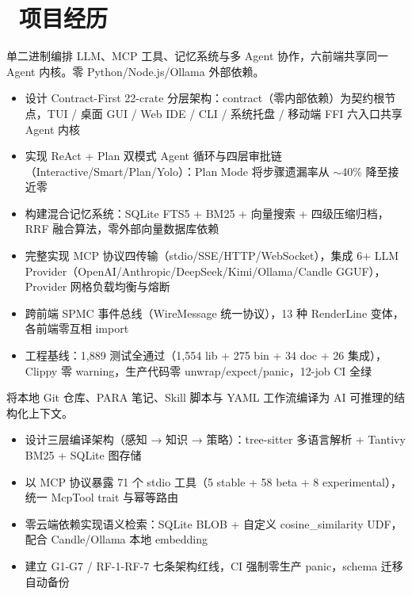 \documentclass{resume}
\begin{document}
\section{\faUsers\ 项目经历}
单二进制编排 LLM、MCP 工具、记忆系统与多 Agent 协作，六前端共享同一 Agent 内核。零 Python/Node.js/Ollama 外部依赖。
\begin{itemize}
  \item 设计 Contract-First 22-crate 分层架构：contract（零内部依赖）为契约根节点，TUI / 桌面 GUI / Web IDE / CLI / 系统托盘 / 移动端 FFI 六入口共享 Agent 内核
  \item 实现 ReAct + Plan 双模式 Agent 循环与四层审批链（Interactive/Smart/Plan/Yolo）：Plan Mode 将步骤遗漏率从 $\sim$40\% 降至接近零
  \item 构建混合记忆系统：SQLite FTS5 + BM25 + 向量搜索 + 四级压缩归档，RRF 融合算法，零外部向量数据库依赖
  \item 完整实现 MCP 协议四传输（stdio/SSE/HTTP/WebSocket），集成 6+ LLM Provider（OpenAI/Anthropic/DeepSeek/Kimi/Ollama/Candle GGUF），Provider 网格负载均衡与熔断
  \item 跨前端 SPMC 事件总线（WireMessage 统一协议），13 种 RenderLine 变体，各前端零互相 import
  \item 工程基线：1,889 测试全通过（1,554 lib + 275 bin + 34 doc + 26 集成），Clippy 零 warning，生产代码零 unwrap/expect/panic，12-job CI 全绿
\end{itemize}

将本地 Git 仓库、PARA 笔记、Skill 脚本与 YAML 工作流编译为 AI 可推理的结构化上下文。
\begin{itemize}
  \item 设计三层编译架构（感知 → 知识 → 策略）：tree-sitter 多语言解析 + Tantivy BM25 + SQLite 图存储
  \item 以 MCP 协议暴露 71 个 stdio 工具（5 stable + 58 beta + 8 experimental），统一 McpTool trait 与幂等路由
  \item 零云端依赖实现语义检索：SQLite BLOB + 自定义 cosine\_similarity UDF，配合 Candle/Ollama 本地 embedding
  \item 建立 G1-G7 / RF-1-RF-7 七条架构红线，CI 强制零生产 panic，schema 迁移自动备份
\end{itemize}
\end{document}
